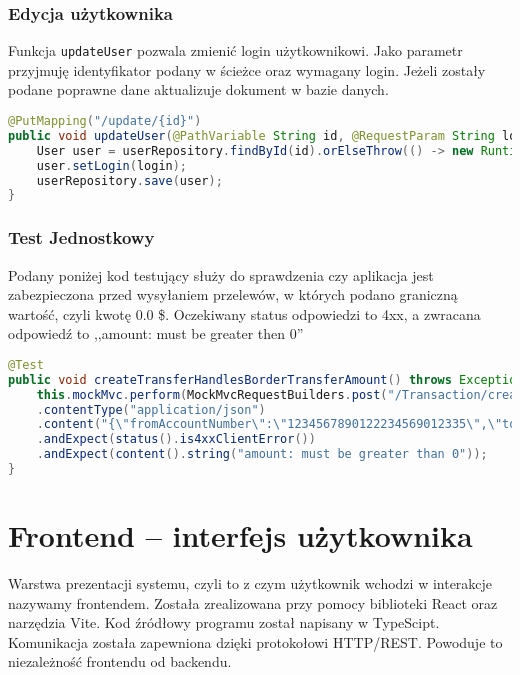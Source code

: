 \subsubsection*{Edycja użytkownika}
Funkcja \texttt{updateUser} pozwala zmienić login użytkownikowi. Jako parametr przyjmuję identyfikator podany w ścieżce oraz wymagany login. Jeżeli zostały podane poprawne dane aktualizuje dokument w bazie danych.
\begin{lstlisting}[language={Java}, caption={Edycja użytkownika}, label={lst:java-update}]
@PutMapping("/update/{id}")
public void updateUser(@PathVariable String id, @RequestParam String login) {
	User user = userRepository.findById(id).orElseThrow(() -> new RuntimeException("User not found"));
	user.setLogin(login);
	userRepository.save(user);
}
\end{lstlisting}
\subsubsection*{Test Jednostkowy}
Podany poniżej kod testujący służy do sprawdzenia czy aplikacja jest zabezpieczona przed wysyłaniem przelewów, w których podano graniczną wartość, czyli kwotę 0.0 \$. Oczekiwany status odpowiedzi to 4xx, a zwracana odpowiedź to ,,amount: must be greater then 0''
\begin{lstlisting}[language={Java}, caption={Przykładowy test}, label={lst:java-UnitTest}]
@Test
public void createTransferHandlesBorderTransferAmount() throws Exception {
	this.mockMvc.perform(MockMvcRequestBuilders.post("/Transaction/create/transfer")
	.contentType("application/json")
	.content("{\"fromAccountNumber\":\"1234567890122234569012335\",\"toAccountNumber\":\"1234567890122234569012335\",\"amount\":0.0}"))
	.andExpect(status().is4xxClientError())
	.andExpect(content().string("amount: must be greater than 0"));
}
\end{lstlisting}
\section{Frontend – interfejs użytkownika}
Warstwa prezentacji systemu, czyli to z czym użytkownik wchodzi w interakcje nazywamy frontendem. Została zrealizowana przy pomocy biblioteki React oraz narzędzia Vite. Kod źródłowy programu został napisany w TypeScipt. Komunikacja została zapewniona dzięki protokołowi HTTP/REST. Powoduje to niezależność frontendu od backendu.
